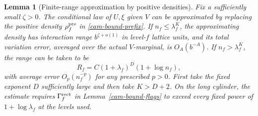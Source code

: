 \documentclass[11pt,a4paper]{article}
\newtheorem{lemma}[theorem]{Lemma}
\numberwithin{equation}{section}
\begin{document}
\begin{lemma}[Finite-range approximation by positive densities]\label{cam-bound-positive}
Fix a sufficiently small \(\zeta>0\). The conditional law of \(U,\xi\) given \(V\) can be approximated by replacing the positive density \(\rho_f^{\rm pre}\) in \eqref{cam-bound-prefix}. If \(n_f\le\lambda_f^K\), the approximating density has interaction range \(b^{\zeta+o(1)}\) in level-\(f\) lattice units, and its total variation error, averaged over the actual \(V\)-marginal, is \(O_A(b^{-A})\). If \(n_f>\lambda_f^K\), the range can be taken to be
\[
 R_f=C(1+\lambda_f)^D(1+\log n_f),
\]
with average error \(O_p(n_f^{-p})\) for any prescribed \(p>0\). First take the fixed exponent \(D\) sufficiently large and then take \(K>D+2\). On the long cylinder, the estimate requires \(\Gamma_f^{\rm rect}\) in Lemma~\ref{cam-bound-flags} to exceed every fixed power of \(1+\log\lambda_f\) at the levels used.
\end{lemma}
\end{document}
